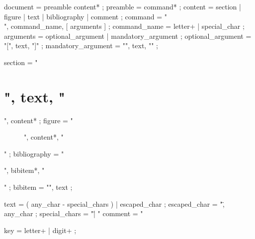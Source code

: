 document        = preamble content* ;
preamble        = command* ;
content         = section | figure | text | bibliography | comment ;
command         = "\\", command_name, [ arguments ] ;
command_name    = letter+ | special_char ;
arguments       = optional_argument | mandatory_argument ;
optional_argument = "[", text, "]" ;
mandatory_argument = "{", text, "}" ;

section         = "\section{", text, "}", content* ;
figure          = "\begin{figure}", content*, "\end{figure}" ;
bibliography    = "\begin{thebibliography}", bibitem*, "\end{thebibliography}" ;
bibitem         = "", text ;

text            = ( any_char - special_chars ) | escaped_char ;
escaped_char    = "\", any_char ;
special_chars   = "\" | "%
comment         = "%

key             = letter+ | digit+ ;

